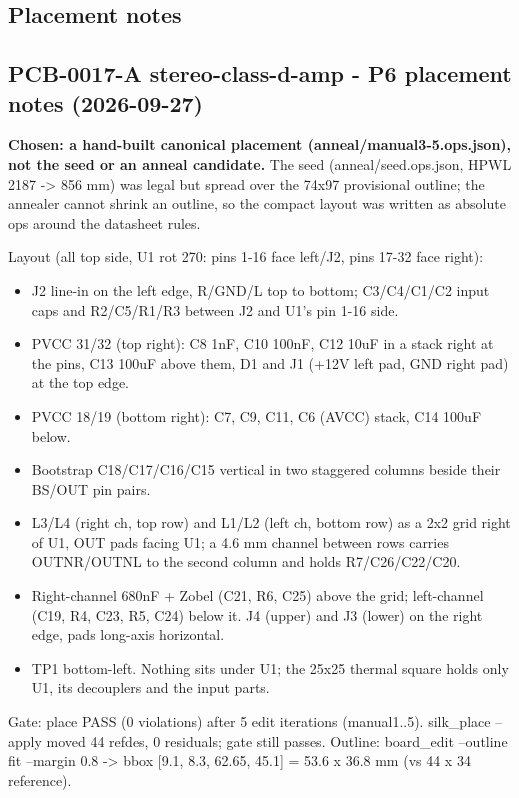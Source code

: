 \documentclass[11pt]{article}
\begin{document}
\subsection*{Placement notes}
\subsection*{PCB-0017-A stereo-class-d-amp - P6 placement notes (2026-09-27)}
\textbf{Chosen: a hand-built canonical placement (anneal/manual3-5.ops.json), not the seed or an anneal candidate.} The seed (anneal/seed.ops.json, HPWL 2187 -\textgreater{} 856 mm) was legal but spread over the 74x97 provisional outline; the annealer cannot shrink an outline, so the compact layout was written as absolute ops around the datasheet rules.

Layout (all top side, U1 rot 270: pins 1-16 face left/J2, pins 17-32 face right):

\begin{itemize}
\item J2 line-in on the left edge, R/GND/L top to bottom; C3/C4/C1/C2 input caps and R2/C5/R1/R3 between J2 and U1's pin 1-16 side.
\item PVCC 31/32 (top right): C8 1nF, C10 100nF, C12 10uF in a stack right at the pins, C13 100uF above them, D1 and J1 (+12V left pad, GND right pad) at the top edge.
\item PVCC 18/19 (bottom right): C7, C9, C11, C6 (AVCC) stack, C14 100uF below.
\item Bootstrap C18/C17/C16/C15 vertical in two staggered columns beside their BS/OUT pin pairs.
\item L3/L4 (right ch, top row) and L1/L2 (left ch, bottom row) as a 2x2 grid right of U1, OUT pads facing U1; a 4.6 mm channel between rows carries OUTNR/OUTNL to the second column and holds R7/C26/C22/C20.
\item Right-channel 680nF + Zobel (C21, R6, C25) above the grid; left-channel (C19, R4, C23, R5, C24) below it. J4 (upper) and J3 (lower) on the right edge, pads long-axis horizontal.
\item TP1 bottom-left. Nothing sits under U1; the 25x25 thermal square holds only U1, its decouplers and the input parts.
\end{itemize}
Gate: place PASS (0 violations) after 5 edit iterations (manual1..5). silk\_place --apply moved 44 refdes, 0 residuals; gate still passes. Outline: board\_edit --outline fit --margin 0.8 -\textgreater{} bbox {[}9.1, 8.3, 62.65, 45.1{]} = 53.6 x 36.8 mm (vs 44 x 34 reference).
\end{document}
